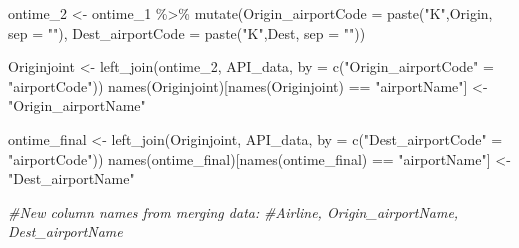 \documentclass[
]{article}
\newenvironment{Shaded}{\begin{snugshade}}{\end{snugshade}}
\newcommand{\AttributeTok}[1]{\textcolor[rgb]{0.77,0.63,0.00}{#1}}
\newcommand{\CommentTok}[1]{\textcolor[rgb]{0.56,0.35,0.01}{\textit{#1}}}
\newcommand{\FunctionTok}[1]{\textcolor[rgb]{0.00,0.00,0.00}{#1}}
\newcommand{\NormalTok}[1]{#1}
\newcommand{\OtherTok}[1]{\textcolor[rgb]{0.56,0.35,0.01}{#1}}
\newcommand{\SpecialCharTok}[1]{\textcolor[rgb]{0.00,0.00,0.00}{#1}}
\newcommand{\StringTok}[1]{\textcolor[rgb]{0.31,0.60,0.02}{#1}}
\begin{document}
\begin{Shaded}
\begin{Highlighting}[]
\NormalTok{ontime\_2 }\OtherTok{\textless{}{-}}\NormalTok{ ontime\_1 }\SpecialCharTok{\%\textgreater{}\%} \FunctionTok{mutate}\NormalTok{(}\AttributeTok{Origin\_airportCode =} \FunctionTok{paste}\NormalTok{(}\StringTok{"K"}\NormalTok{,Origin, }\AttributeTok{sep =} \StringTok{""}\NormalTok{), }\AttributeTok{Dest\_airportCode =} \FunctionTok{paste}\NormalTok{(}\StringTok{"K"}\NormalTok{,Dest, }\AttributeTok{sep =} \StringTok{""}\NormalTok{))}

\NormalTok{Originjoint }\OtherTok{\textless{}{-}} \FunctionTok{left\_join}\NormalTok{(ontime\_2, API\_data, }\AttributeTok{by =} \FunctionTok{c}\NormalTok{(}\StringTok{"Origin\_airportCode"} \OtherTok{=} \StringTok{"airportCode"}\NormalTok{))}
\FunctionTok{names}\NormalTok{(Originjoint)[}\FunctionTok{names}\NormalTok{(Originjoint) }\SpecialCharTok{==} \StringTok{"airportName"}\NormalTok{] }\OtherTok{\textless{}{-}} \StringTok{"Origin\_airportName"}

\NormalTok{ontime\_final }\OtherTok{\textless{}{-}} \FunctionTok{left\_join}\NormalTok{(Originjoint, API\_data, }\AttributeTok{by =} \FunctionTok{c}\NormalTok{(}\StringTok{"Dest\_airportCode"} \OtherTok{=} \StringTok{"airportCode"}\NormalTok{))}
\FunctionTok{names}\NormalTok{(ontime\_final)[}\FunctionTok{names}\NormalTok{(ontime\_final) }\SpecialCharTok{==} \StringTok{"airportName"}\NormalTok{] }\OtherTok{\textless{}{-}} \StringTok{"Dest\_airportName"}

\CommentTok{\#New column names from merging data: }
\CommentTok{\#Airline, Origin\_airportName, Dest\_airportName}
\end{Highlighting}
\end{Shaded}
\end{document}
